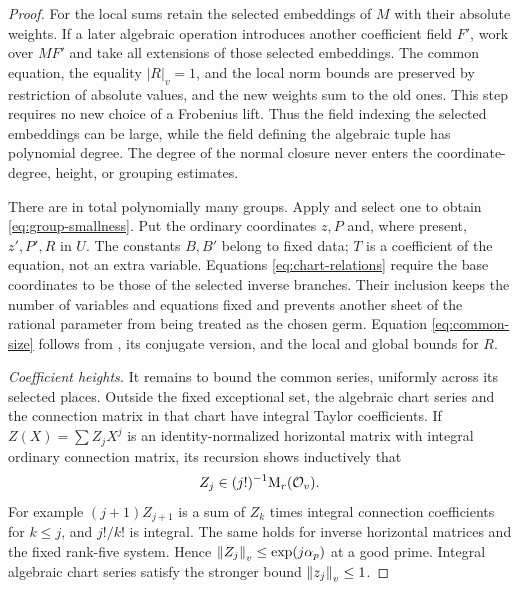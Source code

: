 \begin{proof}
For the local sums retain the selected embeddings of $M$ with their
absolute weights.  If a later algebraic operation introduces another
coefficient field $F'$, work over $MF'$ and take all extensions of those
selected embeddings.  The common equation, the equality $|R|_v=1$, and
the local norm bounds are preserved by restriction of absolute values,
and the new weights sum to the old ones.  This step requires no new
choice of a Frobenius lift.  Thus the field indexing the selected
embeddings can be large, while the field defining the algebraic tuple
has polynomial degree.  The degree of the normal closure never enters
the coordinate-degree, height, or grouping estimates.

There are in total polynomially many groups.  Apply
 and select one to obtain
\eqref{eq:group-smallness}.  Put the ordinary coordinates
$z,P$ and, where present, $z',P',R$ in $U$.  The constants
$B,B'$ belong to fixed data; $T$ is a coefficient of the
equation, not an extra variable.  Equations
\eqref{eq:chart-relations} require the base coordinates to
be those of the selected inverse branches.  Their inclusion
keeps the number of variables and equations fixed and
prevents another sheet of the rational parameter from
being treated as the chosen germ.  Equation
\eqref{eq:common-size} follows from
, its conjugate version, and the local
and global bounds for $R$.

\emph{Coefficient heights.}
It remains to bound the common series, uniformly across its selected
places.  Outside the fixed exceptional set, the algebraic chart series
and the connection matrix in that chart
have integral Taylor coefficients.  If
$Z(X)=\sum Z_jX^j$ is an identity-normalized horizontal
matrix with integral ordinary connection matrix, its
recursion shows inductively that
\[
 Z_j\in (j!)^{-1}\mathrm M_r(\mathcal O_v).
\]
For example $(j+1)Z_{j+1}$ is a sum of $Z_k$ times
integral connection coefficients for $k\le j$, and
$j!/k!$ is integral.  The same holds for inverse
horizontal matrices and the fixed rank-five system.
Hence $\left\lVert Z_j\right\rVert_v\le\exp(j\alpha_p)$ at a good
prime.  Integral algebraic chart series satisfy the
stronger bound $\left\lVert z_j\right\rVert_v\le1$.


\end{proof}
